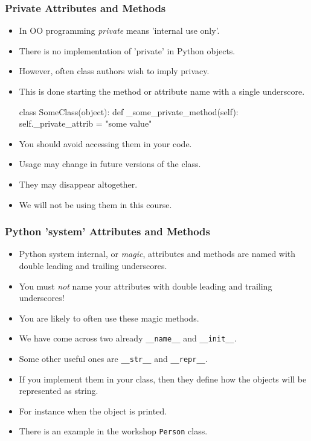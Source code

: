 \documentclass{beamer}
\begin{document}
\begin{frame}[fragile]
\frametitle{Private Attributes and Methods}

\begin{itemize}
\item In OO programming \emph{private} means 'internal use only'.
\item There is no implementation of 'private' in Python objects.
\item However, often class authors wish to imply privacy.
\item This is done starting the method or attribute name with a single underscore.
\begin{code}
class SomeClass(object):
  def _some_private_method(self):
    self._private_attrib = "some value"
\end{code}
\pause
\item You should avoid accessing them in your code.
\item Usage may change in future versions of the class.
\item They may disappear altogether.
\pause
\item We will not be using them in this course.
\end{itemize}

\end{frame}

\begin{frame}[fragile]
\frametitle{Python 'system' Attributes and Methods}
\begin{itemize}
\item Python system internal, or \emph{magic}, attributes and methods are
named with double leading and trailing underscores.
\item You must \emph{not} name your attributes with double leading and trailing underscores!
\pause
\item You are likely to often use these magic methods.
\item We have come across two already \lstinline|__name__| and \lstinline|__init__|.
\pause
\item Some other useful ones are \lstinline|__str__| and \lstinline|__repr__|.
\item If you implement them in your class, then they define how the objects will be represented as string.
\item For instance when the object is printed.
\item There is an example in the workshop \lstinline|Person| class.
\end{itemize}
\end{frame}
\end{document}
